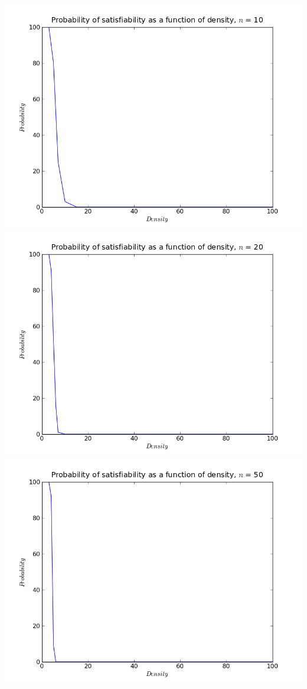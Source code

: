 \documentclass{article}
\begin{document}
\includegraphics[scale=0.5]{probn10.png}
\includegraphics[scale=0.5]{probn20.png}
\includegraphics[scale=0.5]{probn50.png}
\end{document}
